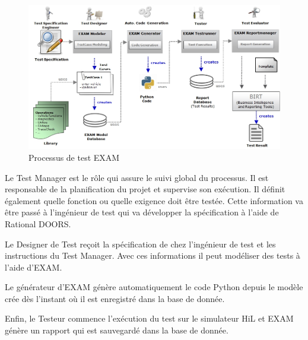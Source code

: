 \begin{figure}[H]
 \centering
 \includegraphics[scale=0.6]{images/process_exam}
 \caption{Processus de test EXAM}
\end{figure}

Le Test Manager est le rôle qui assure le suivi global du processus. Il est responsable de la planification du projet et supervise son exécution. Il définit également quelle fonction ou quelle exigence doit être testée. Cette information va être passé à l'ingénieur de test qui va développer la spécification à l'aide de Rational DOORS.

Le Designer de Test reçoit la spécification de chez l'ingénieur de test et les instructions du Test Manager. Avec ces informations il peut modéliser des tests à l'aide d'EXAM.

Le générateur d'EXAM génère automatiquement le code Python depuis le modèle crée dès l'instant où il est enregistré dans la base de donnée.

Enfin, le Testeur commence l'exécution du test sur le simulateur HiL et EXAM génère un rapport qui est sauvegardé dans la base de donnée.

